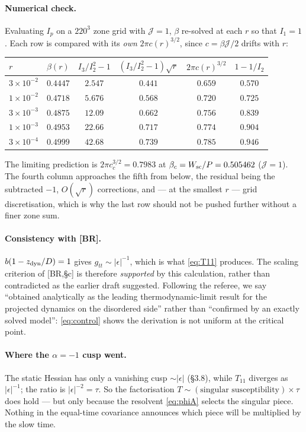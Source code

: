 \documentclass[11pt,a4paper]{article}
\newcommand{\Jc}{\mathcal{J}}
\newcommand{\Jc}{\mathcal{J}}
\newcommand{\Tm}{T}
\begin{document}
\paragraph{Numerical check.} Evaluating $I_p$ on a $220^3$ zone grid with $\Jc=1$, $\beta$
re-solved at each $r$ so that $I_1=1$. Each row is compared with its \emph{own}
$2\pi c(r)^{3/2}$, since $c=\beta\Jc/2$ drifts with $r$:
\begin{center}
\begin{tabular}{lccccc}
\hline
$r$ & $\beta(r)$ & $I_3/I_2^2-1$ & $(I_3/I_2^2-1)\sqrt r$ & $2\pi c(r)^{3/2}$ & $1-1/I_2$\\
\hline
$3\times10^{-2}$ & $0.4447$ & $2.547$  & $0.441$ & $0.659$ & $0.570$\\
$1\times10^{-2}$ & $0.4718$ & $5.676$  & $0.568$ & $0.720$ & $0.725$\\
$3\times10^{-3}$ & $0.4875$ & $12.09$  & $0.662$ & $0.756$ & $0.839$\\
$1\times10^{-3}$ & $0.4953$ & $22.66$  & $0.717$ & $0.774$ & $0.904$\\
$3\times10^{-4}$ & $0.4999$ & $42.68$  & $0.739$ & $0.785$ & $0.946$\\
\hline
\end{tabular}
\end{center}
The limiting prediction is $2\pi c_c^{3/2}=0.7983$ at
$\beta_c=W_{\rm sc}/P=0.505462$ ($\Jc=1$). The fourth column approaches the fifth from
below, the residual being the subtracted $-1$, $O(\sqrt r)$ corrections, and --- at the
smallest $r$ --- grid discretisation, which is why the last row should not be pushed
further without a finer zone sum.

\paragraph{Consistency with [BR].} $b(1-z_{\rm dyn}/D)=1$ gives $g_{tt}\sim|\epsilon|^{-1}$,
which is what \eqref{eq:T11} produces. The scaling criterion of [BR,\S c] is therefore
\emph{supported} by this calculation, rather than contradicted as the earlier draft
suggested. Following the referee, we say ``obtained analytically as the leading
thermodynamic-limit result for the projected dynamics on the disordered side'' rather than
``confirmed by an exactly solved model'': \eqref{eq:control} shows the derivation is not
uniform at the critical point.

\paragraph{Where the $\alpha=-1$ cusp went.} The static Hessian has only a vanishing cusp
$\sim|\epsilon|$ (\S3.8), while $\Tm_{11}$ diverges as $|\epsilon|^{-1}$; the ratio is
$|\epsilon|^{-2}=\tau$. So the factorisation
$\Tm\sim(\text{singular susceptibility})\times\tau$ does hold --- but only because the
resolvent \eqref{eq:phiA} selects the singular piece. Nothing in the equal-time covariance
announces which piece will be multiplied by the slow time.
\end{document}
